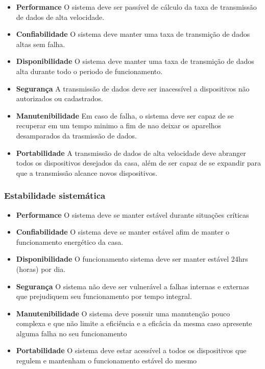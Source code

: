 \begin{itemize}

	\item \textbf{Performance}
	O sistema deve ser passível de cálculo da taxa de transmissão de dados de alta velocidade. 

	\item \textbf{Confiabilidade}
	O sistema deve manter uma taxa de transmição de dados altas sem falha.

	\item \textbf{Disponibilidade}
	O sistema deve manter uma taxa de transmição de dados alta durante todo o periodo de funcionamento.

	\item \textbf{Segurança}
	A transmissão de dados deve ser inacessível a dispositivos não autorizados ou cadastrados.

	\item \textbf{Manutenibilidade}
	Em caso de falha, o sistema deve ser capaz de se recuperar em um tempo minimo a fim de nao deixar os aparelhos desamparados da trasmissão de dados.

	\item \textbf{Portabilidade}
	A transmissão de dados de alta velocidade deve abranger todos os dispositivos desejados da casa, além de ser capaz de se expandir para que a transmissão alcance novos dispositivos.

\end{itemize}

\subsubsection{Estabilidade sistemática}
\begin{itemize}

	\item \textbf{Performance}
	O sistema deve se manter estável durante situações críticas

	\item \textbf{Confiabilidade}
	O sistema deve se manter estável afim de manter o funcionamento energético da casa.

	\item \textbf{Disponibilidade}
	O funcionamento sistema deve ser manter estável 24hrs (horas) por dia.

	\item \textbf{Segurança}
	O sistema não deve ser vulnerável a falhas internas e externas que prejudiquem seu funcionamento por tempo integral.

	\item \textbf{Manutenibilidade}
	O sistema deve possuir uma manutenção pouco complexa e que não limite a eficiência e a eficâcia da mesma caso apresente alguma falha no seu funcionamento

	\item \textbf{Portabilidade}
	O sistema deve estar acessível a todos os dispositivos que regulem e mantenham o funcionamento estável do mesmo
	
\end{itemize}

